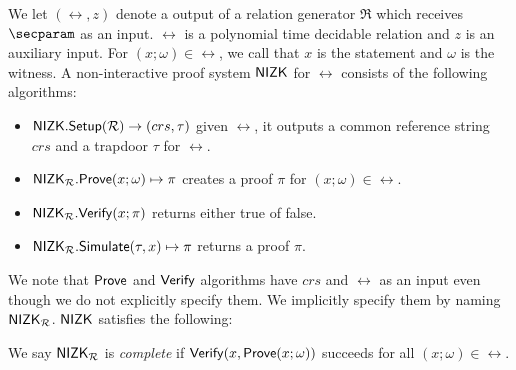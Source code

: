 % 

We let $ (\rel,z) $ denote a output of a relation generator $ \mathfrak{R} $ which receives $ \secparam $ as an input. $ \rel $ is a polynomial time decidable relation and $ z $ is an auxiliary input. For $ (x;\omega) \in \rel $, we call that $ x$ is the statement and $ \omega $ is the witness.
A non-interactive proof system $ {\mathsf{NIZK}} $ for $\rel$ consists of the following algorithms:
\begin{itemize}
\item ${\mathsf{NIZK}}.{\mathsf{Setup}}(\mathcal{R}) \rightarrow (crs, \tau)$  given $ \rel $, it outputs a common reference string $ crs $ and a trapdoor $ \tau $ for $ \rel $.
\item ${\mathsf{NIZK}}_{\mathcal{R}}.{\mathsf{Prove}}(x; \omega) \mapsto \pi$ creates a proof $\pi$ for  $(x; \omega) \in \rel$. 
\item ${\mathsf{NIZK}}_{\mathcal{R}}.{\mathsf{Verify}}(x; \pi)$ returns either true of false.
\item $ {\mathsf{NIZK}}_{\mathcal{R}}.{\mathsf{Simulate}}(\tau,x) \mapsto \pi$ returns a proof $ \pi $.
\end{itemize}	
We note that $ {\mathsf{Prove}} $ and $ {\mathsf{Verify}} $ algorithms have $ crs $ and $ \rel $ as an input even though we do not explicitly specify them. We implicitly specify them by naming $ {\mathsf{NIZK}}_{\mathcal{R}} $. $ {\mathsf{NIZK}} $ satisfies the following:


\begin{definition}\label{def:nizk_completeness}
We say ${\mathsf{NIZK}}_{\mathcal{R}}$ is {\em complete} if ${\mathsf{Verify}}(x, {\mathsf{Prove}}(x; \omega))$ succeeds for all $(x; \omega) \in \rel$.  %
\end{definition}

